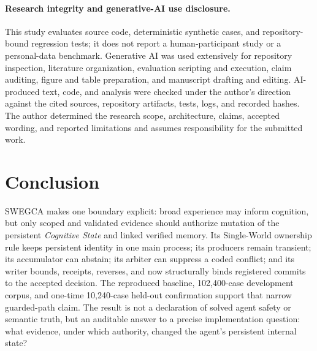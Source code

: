 \documentclass[10pt]{article}
\newcommand{\swegca}{\textsc{SWEGCA}}
\newcommand{\cstate}{\textit{Cognitive State}}
\begin{document}
\paragraph{Research integrity and generative-AI use disclosure.}
This study evaluates source code, deterministic synthetic cases, and repository-bound regression tests; it does not report a human-participant study or a personal-data benchmark. Generative AI was used extensively for repository inspection, literature organization, evaluation scripting and execution, claim auditing, figure and table preparation, and manuscript drafting and editing. AI-produced text, code, and analysis were checked under the author's direction against the cited sources, repository artifacts, tests, logs, and recorded hashes. The author determined the research scope, architecture, claims, accepted wording, and reported limitations and assumes responsibility for the submitted work.

\section{Conclusion}

\swegca{} makes one boundary explicit: broad experience may inform cognition, but only scoped and validated evidence should authorize mutation of the persistent \cstate{} and linked verified memory. Its Single-World ownership rule keeps persistent identity in one main process; its producers remain transient; its accumulator can abstain; its arbiter can suppress a coded conflict; and its writer bounds, receipts, reverses, and now structurally binds registered commits to the accepted decision. The reproduced baseline, 102,400-case development corpus, and one-time 10,240-case held-out confirmation support that narrow guarded-path claim. The result is not a declaration of solved agent safety or semantic truth, but an auditable answer to a precise implementation question: what evidence, under which authority, changed the agent's persistent internal state?

\begingroup
\scriptsize


\endgroup
\end{document}
